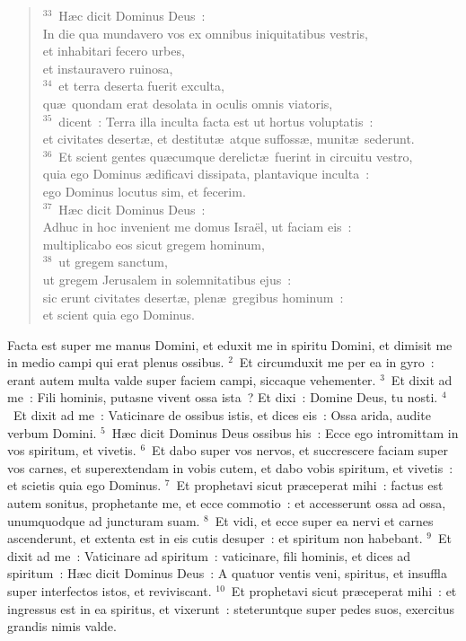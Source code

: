\begin{flushleft}\begin{verse}${}^{33}$~H\ae c dicit Dominus Deus~:\\ In die qua mundavero vos ex omnibus iniquitatibus vestris,\\ et inhabitari fecero urbes,\\ et instauravero ruinosa,\\
${}^{34}$~et terra deserta fuerit exculta,\\ qu\ae\ quondam erat desolata in oculis omnis viatoris,\\
${}^{35}$~dicent~: Terra illa inculta facta est ut hortus voluptatis~:\\ et civitates desert\ae , et destitut\ae\ atque suffoss\ae , munit\ae\ sederunt.\\
${}^{36}$~Et scient gentes qu\ae cumque derelict\ae\ fuerint in circuitu vestro,\\ quia ego Dominus \ae dificavi dissipata, plantavique inculta~:\\ ego Dominus locutus sim, et fecerim.\\
${}^{37}$~H\ae c dicit Dominus Deus~:\\ Adhuc in hoc invenient me domus Isra\"el, ut faciam eis~:\\ multiplicabo eos sicut gregem hominum,\\
${}^{38}$~ut gregem sanctum,\\ ut gregem Jerusalem in solemnitatibus ejus~:\\ sic erunt civitates desert\ae , plen\ae\ gregibus hominum~:\\ et scient quia ego Dominus.\end{verse}\end{flushleft}



\lettrine[lines=10,image=true,loversize=0.05,lraise=-0.03]{F}{}acta est super me manus Domini, et eduxit me in spiritu Domini, et dimisit me in medio campi qui erat plenus ossibus.
${}^{2}$~Et circumduxit me per ea in gyro~: erant autem multa valde super faciem campi, siccaque vehementer.
${}^{3}$~Et dixit ad me~: Fili hominis, putasne vivent ossa ista~? Et dixi~: Domine Deus, tu nosti.
${}^{4}$~Et dixit ad me~: Vaticinare de ossibus istis, et dices eis~: Ossa arida, audite verbum Domini.
${}^{5}$~H\ae c dicit Dominus Deus ossibus his~: Ecce ego intromittam in vos spiritum, et vivetis.
${}^{6}$~Et dabo super vos nervos, et succrescere faciam super vos carnes, et superextendam in vobis cutem, et dabo vobis spiritum, et vivetis~: et scietis quia ego Dominus.
${}^{7}$~Et prophetavi sicut pr\ae ceperat mihi~: factus est autem sonitus, prophetante me, et ecce commotio~: et accesserunt ossa ad ossa, unumquodque ad juncturam suam.
${}^{8}$~Et vidi, et ecce super ea nervi et carnes ascenderunt, et extenta est in eis cutis desuper~: et spiritum non habebant.
${}^{9}$~Et dixit ad me~: Vaticinare ad spiritum~: vaticinare, fili hominis, et dices ad spiritum~: H\ae c dicit Dominus Deus~: A quatuor ventis veni, spiritus, et insuffla super interfectos istos, et reviviscant.
${}^{10}$~Et prophetavi sicut pr\ae ceperat mihi~: et ingressus est in ea spiritus, et vixerunt~: steteruntque super pedes suos, exercitus grandis nimis valde.


